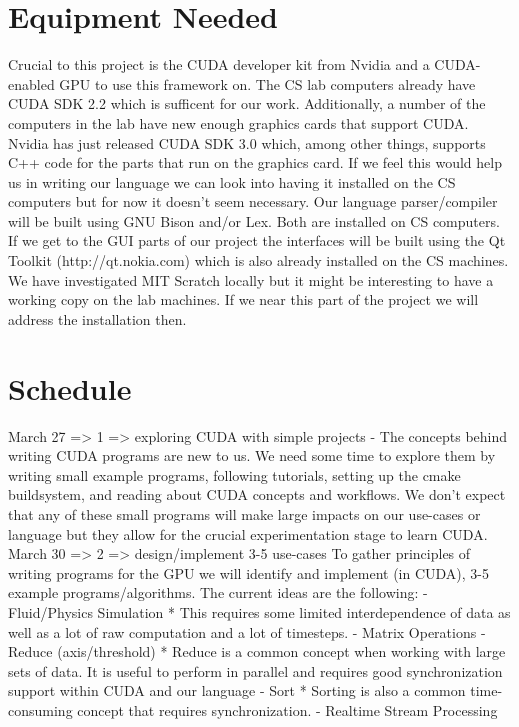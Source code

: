 \documentclass{article}
\begin{document}
\section{Equipment Needed}
Crucial to this project is the CUDA developer kit from Nvidia and a CUDA-enabled GPU to use this framework on. The CS lab computers already have CUDA SDK 2.2 which is sufficent for our work. Additionally, a number of the computers in the lab have new enough graphics cards that support CUDA. Nvidia has just released CUDA SDK 3.0 which, among other things, supports C++ code for the parts that run on the graphics card. If we feel this would help us in writing our language we can look into having it installed on the CS computers but for now it doesn't seem necessary. Our language parser/compiler will be built using GNU Bison and/or Lex. Both are installed on CS computers. If we get to the GUI parts of our project the interfaces will be built using the Qt Toolkit (http://qt.nokia.com) which is also already installed on the CS machines. We have investigated MIT Scratch locally but it might be interesting to have a working copy on the lab machines. If we near this part of the project we will address the installation then.

\section{Schedule}
March 27 => 1 => exploring CUDA with simple projects
  - The concepts behind writing CUDA programs are new to us. We need some time to explore them by writing small example programs, following tutorials, setting up the cmake buildsystem, and reading about CUDA concepts and workflows. We don't expect that any of these small programs will make large impacts on our use-cases or language but they allow for the crucial experimentation stage to learn CUDA.
March 30 => 2 => design/implement 3-5 use-cases
  To gather principles of writing programs for the GPU we will identify and implement (in CUDA), 3-5 example programs/algorithms. The current ideas are the following:
  - Fluid/Physics Simulation
    * This requires some limited interdependence of data as well as a lot of raw computation and a lot of timesteps.
  - Matrix Operations
  - Reduce (axis/threshold)
    * Reduce is a common concept when working with large sets of data. It is useful to perform in parallel and requires good synchronization support within CUDA and our language
  - Sort
    * Sorting is also a common time-consuming concept that requires synchronization.
  - Realtime Stream Processing
\end{document}
